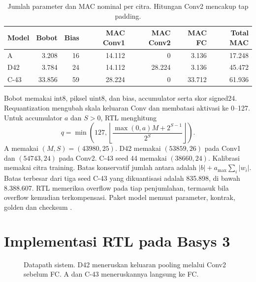 \documentclass[11pt,a4paper]{article}
\begin{document}
\begin{table}[H]
\centering
\caption{Jumlah parameter dan MAC nominal per citra. Hitungan Conv2 mencakup tap padding.}
\begin{tabular}{lrrrrrr}
\toprule
Model & Bobot & Bias & MAC Conv1 & MAC Conv2 & MAC FC & Total MAC \\
\midrule
A & 3.208 & 16 & 14.112 & 0 & 3.136 & 17.248 \\
D42 & 3.784 & 24 & 14.112 & 28.224 & 3.136 & 45.472 \\
C-43 & 33.856 & 59 & 28.224 & 0 & 33.712 & 61.936 \\
\bottomrule
\end{tabular}
\end{table}

Bobot memakai int8, piksel uint8, dan bias, accumulator serta skor
signed24. Requantization mengubah skala keluaran Conv dan membatasi
aktivasi ke 0--127. Untuk accumulator \(a\) dan \(S>0\), RTL menghitung
\[
 q=\min\left(127,\left\lfloor
 \frac{\max(0,a)M+2^{S-1}}{2^S}
 \right\rfloor\right).
\]
A memakai \((M,S)=(43980,25)\). D42 memakai \((53859,26)\) pada Conv1
dan \((54743,24)\) pada Conv2. C-43 seed 44 memakai \((38660,24)\).
Kalibrasi memakai citra training. Batas konservatif jumlah antara
adalah \(|b|+a_{\max}\sum_i|w_i|\). Batas terbesar dari tiga seed C-43
yang dikuantisasi adalah 835.898, di bawah 8.388.607. RTL memeriksa
overflow pada tiap penjumlahan, termasuk bila overflow kemudian
terkompensasi. Paket model memuat parameter, kontrak, golden dan
checksum \cite{repo}.

\section{Implementasi RTL pada Basys 3}
\begin{figure}[H]
\centering
{}
\caption{Datapath sistem. D42 meneruskan keluaran pooling melalui Conv2 sebelum FC. A dan C-43 meneruskannya langsung ke FC.}
\end{figure}
\end{document}
